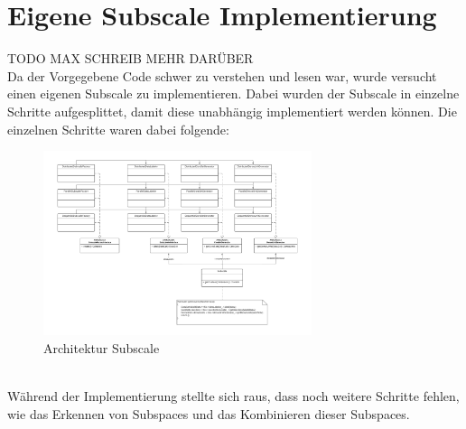 \section{Eigene Subscale Implementierung}
TODO MAX SCHREIB MEHR DARÜBER \\
Da der Vorgegebene Code schwer zu verstehen und lesen war, wurde versucht einen eigenen Subscale zu implementieren. Dabei wurden der Subscale in einzelne Schritte aufgesplittet, damit diese unabhängig implementiert werden können. Die einzelnen Schritte waren dabei folgende:
\begin{figure}[h]
	\centering
	\includegraphics[width=0.7\textwidth]{./Bilder/Architektur.png}
	\caption{Architektur Subscale}
\end{figure}
\\
Während der Implementierung stellte sich raus, dass noch weitere Schritte fehlen, wie das Erkennen von Subspaces und das Kombinieren dieser Subspaces. 